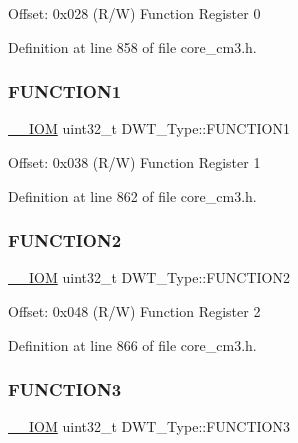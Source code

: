 Offset\+: 0x028 (R/W) Function Register 0 

Definition at line 858 of file core\+\_\+cm3.\+h.

\mbox{\label{struct_d_w_t___type_a8dfcf25675f9606aa305c46e85182e4e}} 
\subsubsection{\texorpdfstring{F\+U\+N\+C\+T\+I\+O\+N1}{FUNCTION1}}
{\footnotesize\ttfamily \hyperlink{core__sc300_8h_ab6caba5853a60a17e8e04499b52bf691}{\+\_\+\+\_\+\+I\+OM} uint32\+\_\+t D\+W\+T\+\_\+\+Type\+::\+F\+U\+N\+C\+T\+I\+O\+N1}

Offset\+: 0x038 (R/W) Function Register 1 

Definition at line 862 of file core\+\_\+cm3.\+h.

\mbox{\label{struct_d_w_t___type_ab1b60d6600c38abae515bab8e86a188f}} 
\subsubsection{\texorpdfstring{F\+U\+N\+C\+T\+I\+O\+N2}{FUNCTION2}}
{\footnotesize\ttfamily \hyperlink{core__sc300_8h_ab6caba5853a60a17e8e04499b52bf691}{\+\_\+\+\_\+\+I\+OM} uint32\+\_\+t D\+W\+T\+\_\+\+Type\+::\+F\+U\+N\+C\+T\+I\+O\+N2}

Offset\+: 0x048 (R/W) Function Register 2 

Definition at line 866 of file core\+\_\+cm3.\+h.

\mbox{\label{struct_d_w_t___type_a52d4ff278fae6f9216c63b74ce328841}} 
\subsubsection{\texorpdfstring{F\+U\+N\+C\+T\+I\+O\+N3}{FUNCTION3}}
{\footnotesize\ttfamily \hyperlink{core__sc300_8h_ab6caba5853a60a17e8e04499b52bf691}{\+\_\+\+\_\+\+I\+OM} uint32\+\_\+t D\+W\+T\+\_\+\+Type\+::\+F\+U\+N\+C\+T\+I\+O\+N3}


